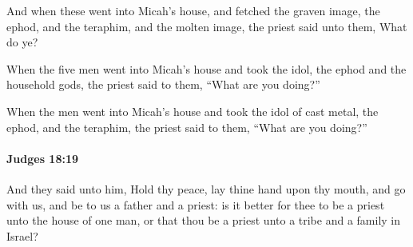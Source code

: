 			\begin{versebox}
					\item[BHS] 
					\item[ASV] And when these went into Micah's house, and fetched the graven image, the ephod, and the teraphim, and the molten image, the priest said unto them, What do ye?
					\item[NIV] When the five men went into Micah’s house and took the idol, the ephod and the household gods, the priest said to them, “What are you doing?”
					\item[NRSV] When the men went into Micah’s house and took the idol of cast metal, the ephod, and the teraphim, the priest said to them, “What are you doing?”
			\end{versebox}

		\paragraph{Judges 18:19} %
			\label{JUDGES-18-19}

			And they said unto him, Hold thy peace, lay thine hand upon thy mouth, and go with us, and be to us a father and a priest: is it better for thee to be a priest unto the house of one man, or that thou be a priest unto a tribe and a family in Israel?


